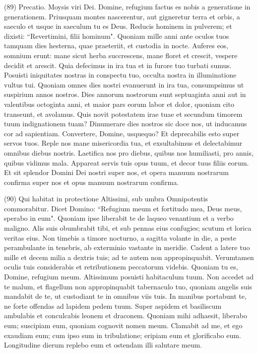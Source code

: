 \begin{biblechapter}  (89) 
\verse  Precatio. Moysis viri Dei. Domine, refugium factus es nobis a generatione in generationem. 
\verse Priusquam montes nascerentur, aut gigneretur terra et orbis, a saeculo et usque in saeculum tu es Deus. 
\verse Reducis hominem in pulverem; et dixisti: “Revertimini, filii hominum". 
\verse Quoniam mille anni ante oculos tuos tamquam dies hesterna, quae praeteriit, et custodia in nocte. 
\verse Auferes eos, somnium erunt: 
\verse mane sicut herba succrescens, mane floret et crescit, vespere decidit et arescit. 
\verse Quia defecimus in ira tua et in furore tuo turbati sumus. 
\verse Posuisti iniquitates nostras in conspectu tuo, occulta nostra in illuminatione vultus tui. 
\verse Quoniam omnes dies nostri evanuerunt in ira tua, consumpsimus ut suspirium annos nostros. 
\verse Dies annorum nostrorum sunt septuaginta anni aut in valentibus octoginta anni, et maior pars eorum labor et dolor, quoniam cito transeunt, et avolamus. 
\verse Quis novit potestatem irae tuae et secundum timorem tuum indignationem tuam? 
\verse Dinumerare dies nostros sic doce nos, ut inducamus cor ad sapientiam. 
\verse Convertere, Domine, usquequo? Et deprecabilis esto super servos tuos. 
\verse Reple nos mane misericordia tua, et exsultabimus et delectabimur omnibus diebus nostris. 
\verse Laetifica nos pro diebus, quibus nos humiliasti, pro annis, quibus vidimus mala. 
\verse Appareat servis tuis opus tuum, et decor tuus filiis eorum. 
\verse Et sit splendor Domini Dei nostri super nos, et opera manuum nostrarum confirma super nos et opus manuum nostrarum confirma. 
\end{biblechapter}

\begin{biblechapter}  (90) 
\verse Qui habitat in protectione Altissimi, sub umbra Omnipotentis commorabitur. 
\verse Dicet Domino: “Refugium meum et fortitudo mea, Deus meus, sperabo in eum". 
\verse Quoniam ipse liberabit te de laqueo venantium et a verbo maligno. 
\verse Alis suis obumbrabit tibi, et sub pennas eius confugies; scutum et lorica veritas eius. 
\verse Non timebis a timore nocturno, a sagitta volante in die, 
\verse a peste perambulante in tenebris, ab exterminio vastante in meridie. 
\verse Cadent a latere tuo mille et decem milia a dextris tuis; ad te autem non appropinquabit. 
\verse Verumtamen oculis tuis considerabis et retributionem peccatorum videbis. 
\verse Quoniam tu es, Domine, refugium meum. Altissimum posuisti habitaculum tuum. 
\verse Non accedet ad te malum, et flagellum non appropinquabit tabernaculo tuo, 
\verse quoniam angelis suis mandabit de te, ut custodiant te in omnibus viis tuis. 
\verse In manibus portabunt te, ne forte offendas ad lapidem pedem tuum. 
\verse Super aspidem et basiliscum ambulabis et conculcabis leonem et draconem. 
\verse Quoniam mihi adhaesit, liberabo eum; suscipiam eum, quoniam cognovit nomen meum. 
\verse Clamabit ad me, et ego exaudiam eum; cum ipso sum in tribulatione; eripiam eum et glorificabo eum. 
\verse Longitudine dierum replebo eum et ostendam illi salutare meum. 
\end{biblechapter}

